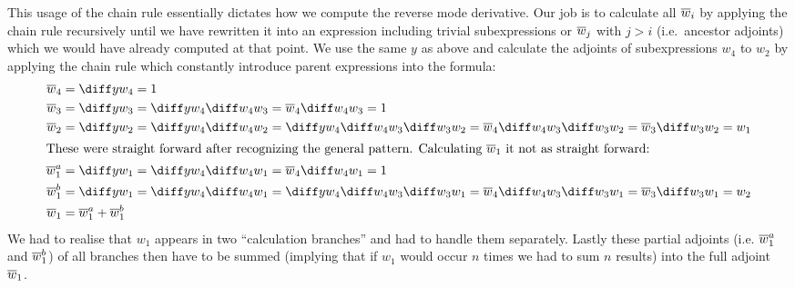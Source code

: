 This usage of the chain rule essentially dictates how we compute the reverse mode derivative. Our job is to calculate all $\overline{w}_{i}$ by applying the chain rule recursively until we have rewritten it into an expression including trivial subexpressions or $\overline{w}_{j}$ with $j > i$ (i.e.\ ancestor adjoints) which we would have already computed at that point. We use the same $y$ as above and calculate the adjoints of subexpressions $w_4$ to $w_2$ by applying the chain rule which constantly introduce parent expressions into the formula:
\yExampleDiff
\begin{align*}
    \overw{4}   & = \diffyw{4} = 1                                                                                                           \\
    \overw{3}   & = \diffyw{3} = \diffyw{4}\diffw{4}{3} = \overw{4}\diffw{4}{3} = 1                                                          \\
    \overw{2}   & = \diffyw{2} = \diffyw{4}\diffw{4}{2} = \diffyw{4}\diffw{4}{3}\diffw{3}{2} = \overw{4}\diffw{4}{3}\diffw{3}{2} = \overw{3}\diffw{3}{2} = w_1       \\
    \intertext{These were straight forward after recognizing the general pattern. Calculating $\overw{1}$ it not as straight forward:}
    \overw{1}^a & = \diffyw{1} = \diffyw{4}\diffw{4}{1} = \overw{4}\diffw{4}{1} = 1 \\
    \overw{1}^b & = \diffyw{1} = \diffyw{4}\diffw{4}{1} = \diffyw{4}\diffw{4}{3}\diffw{3}{1} = \overw{4}\diffw{4}{3}\diffw{3}{1} = \overw{3}\diffw{3}{1} = w_2       \\
    \overw{1}   & = \overw{1}^a + \overw{1}^b
\end{align*}
We had to realise that $w_1$ appears in two ``calculation branches'' and had to handle them separately. Lastly these partial adjoints (i.e. $\overline{w}_{1}^a$ and $\overline{w}_{1}^b$) of all branches then have to be summed (implying that if $w_1$ would occur $n$ times we had to sum $n$ results) into the full adjoint $\overline{w}_{1}$.


